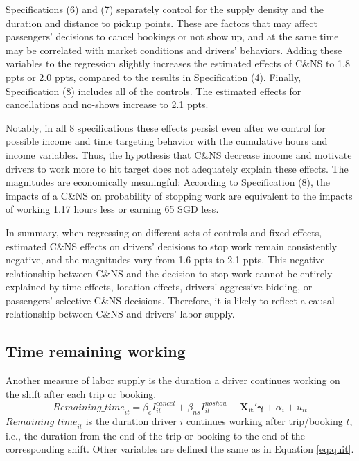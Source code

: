 \documentclass[reviewmode]{restud}
\begin{document}
Specifications (6) and (7) separately control for the supply density %
 and the duration and distance to pickup points. These are factors that may affect passengers' decisions to cancel bookings or not show up, and at the same time may be correlated with market conditions and drivers' behaviors.  Adding these variables to the regression slightly increases the estimated effects of C\&NS to 1.8 ppts or 2.0 ppts, compared to the results in Specification (4). Finally, Specification (8) includes all of the controls. The estimated effects for cancellations and no-shows increase to  2.1 ppts.

Notably, in all 8 specifications these effects persist even after we control for possible income and time targeting behavior with the cumulative hours and income variables. Thus, the hypothesis that C\&NS decrease income and motivate drivers to work more to hit target does not adequately explain these effects. The magnitudes are economically meaningful: According to Specification (8), the impacts of a C\&NS on probability of stopping work are equivalent to the impacts of working 1.17 hours less or earning 65 SGD less.

In summary, when regressing on different sets of controls and fixed effects, estimated C\&NS effects on drivers' decisions to stop work remain consistently negative, and the magnitudes vary
from 1.6 ppts to 2.1 ppts. This negative relationship between C\&NS and the decision to stop work cannot be entirely explained by time effects, location effects, drivers' aggressive bidding, or passengers' selective C\&NS decisions. Therefore, it is likely to reflect a causal relationship between C\&NS and drivers' labor supply.

\subsection{Time remaining working}
Another measure of labor supply is the duration a driver continues working on the shift after each trip or booking. 
\begin{equation}
\label{eq:rmins}
{Remaining\_time}_{it} = \beta_c I^{cancel}_{it} + \beta_{ns} I^{noshow}_{it}  + \mathbf{X_{it}}'\mathbf{\gamma} + \alpha_i + u_{it}
\end{equation}
${Remaining\_time}_{it}$ is the duration driver $i$ continues working after trip/booking $t$, i.e., the duration from the end of the trip or booking to the end of the corresponding shift. %
Other variables are defined the same as in Equation \eqref{eq:quit}.
\end{document}
